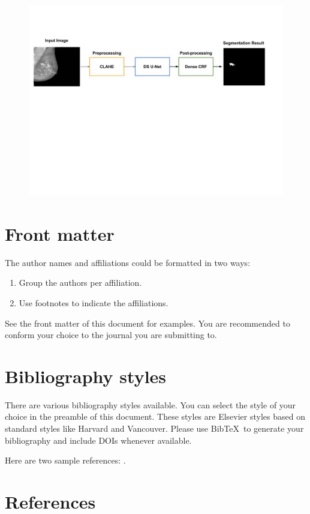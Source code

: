 \documentclass[review]{elsarticle}
\newcommand{\<}{${<}$}
\begin{document}
\begin{enumerate}
\begin{figure}[t]
\includegraphics[width=\textwidth]{fig2_JPG}
\centering
\end{figure}

\end{enumerate}

\section{Front matter}

The author names and affiliations could be formatted in two ways:
\begin{enumerate}[(1)]
\item Group the authors per affiliation.
\item Use footnotes to indicate the affiliations.
\end{enumerate}
See the front matter of this document for examples. You are recommended to conform your choice to the journal you are submitting to.

\section{Bibliography styles}

There are various bibliography styles available. You can select the style of your choice in the preamble of this document. These styles are Elsevier styles based on standard styles like Harvard and Vancouver. Please use Bib\TeX\ to generate your bibliography and include DOIs whenever available.

Here are two sample references: \cite{Feynman1963118,Dirac1953888}.

\section*{References}


\end{document}
